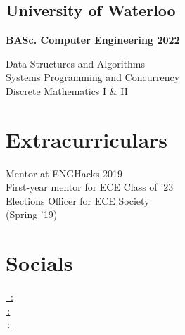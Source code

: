 \documentclass[]{deedy-resume-openfont}
\begin{document}
\begin{minipage}[t]{0.33\textwidth}
\subsection{University of Waterloo}
\textbf{BASc. Computer Engineering 2022}

\textbullet{} Data Structures and Algorithms \\
\textbullet{} Systems Programming and Concurrency \\
\textbullet{} Discrete Mathematics I \& II \\



\sectionsep


\section{Extracurriculars} 
\textbullet{} Mentor at ENGHacks 2019 \\
\textbullet{} First-year mentor for ECE Class of '23 \\
\textbullet{} Elections Officer for ECE Society \\ 
\hspace{0.7em}(Spring '19) 

\sectionsep


\section{Socials}
\href{https://www.linkedin.com/in/mhabaig/}{\faLinkedinSquare \, : } \\
\href{https://github.com/baighamza}{\faGithubSquare \,: } \\
\href{http://www.hamzais.me/}{\faGlobe\,:\,}




%
%

\end{minipage} 
\hfill
\end{document}
